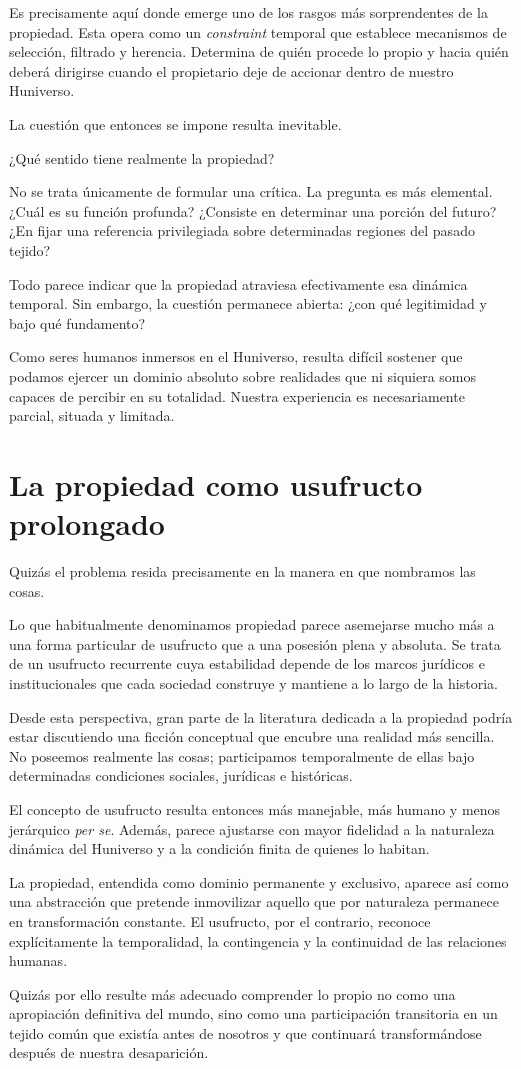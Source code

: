 \documentclass[12pt,a4paper]{article}
\begin{document}
Es precisamente aquí donde emerge uno de los rasgos más sorprendentes de la propiedad. Esta opera como un \textit{constraint} temporal que establece mecanismos de selección, filtrado y herencia. Determina de quién procede lo propio y hacia quién deberá dirigirse cuando el propietario deje de accionar dentro de nuestro Huniverso.

La cuestión que entonces se impone resulta inevitable.

¿Qué sentido tiene realmente la propiedad?

No se trata únicamente de formular una crítica. La pregunta es más elemental. ¿Cuál es su función profunda? ¿Consiste en determinar una porción del futuro? ¿En fijar una referencia privilegiada sobre determinadas regiones del pasado tejido?

Todo parece indicar que la propiedad atraviesa efectivamente esa dinámica temporal. Sin embargo, la cuestión permanece abierta: ¿con qué legitimidad y bajo qué fundamento?

Como seres humanos inmersos en el Huniverso, resulta difícil sostener que podamos ejercer un dominio absoluto sobre realidades que ni siquiera somos capaces de percibir en su totalidad. Nuestra experiencia es necesariamente parcial, situada y limitada.

\section*{La propiedad como usufructo prolongado}

Quizás el problema resida precisamente en la manera en que nombramos las cosas.

Lo que habitualmente denominamos propiedad parece asemejarse mucho más a una forma particular de usufructo que a una posesión plena y absoluta. Se trata de un usufructo recurrente cuya estabilidad depende de los marcos jurídicos e institucionales que cada sociedad construye y mantiene a lo largo de la historia.

Desde esta perspectiva, gran parte de la literatura dedicada a la propiedad podría estar discutiendo una ficción conceptual que encubre una realidad más sencilla. No poseemos realmente las cosas; participamos temporalmente de ellas bajo determinadas condiciones sociales, jurídicas e históricas.

El concepto de usufructo resulta entonces más manejable, más humano y menos jerárquico \textit{per se}. Además, parece ajustarse con mayor fidelidad a la naturaleza dinámica del Huniverso y a la condición finita de quienes lo habitan.

La propiedad, entendida como dominio permanente y exclusivo, aparece así como una abstracción que pretende inmovilizar aquello que por naturaleza permanece en transformación constante. El usufructo, por el contrario, reconoce explícitamente la temporalidad, la contingencia y la continuidad de las relaciones humanas.

Quizás por ello resulte más adecuado comprender lo propio no como una apropiación definitiva del mundo, sino como una participación transitoria en un tejido común que existía antes de nosotros y que continuará transformándose después de nuestra desaparición.
\end{document}

